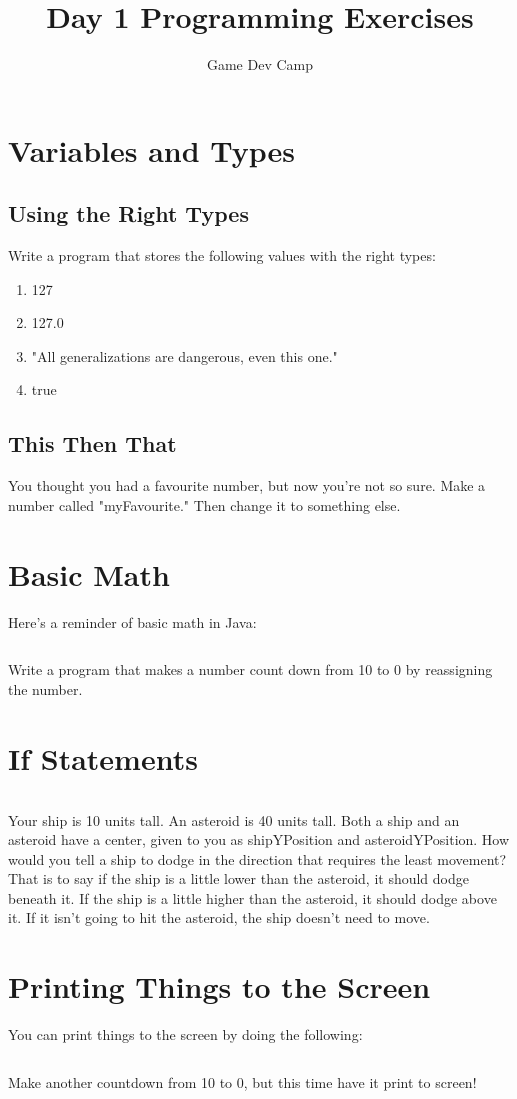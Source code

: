 \documentclass[11pt]{scrartcl}
\title{Day 1 Programming Exercises}
\author{Game Dev Camp}
\begin{document}
	
	\maketitle
	
	\section{Variables and Types}
	
	\subsection{Using the Right Types}
	
		Write a program that stores the following values with the right types:
		
		\begin{enumerate}
			\item 127
			\item 127.0
			\item "All generalizations are dangerous, even this one."
			\item true
		\end{enumerate}
	
	\subsection{This Then That}
	
		You thought you had a favourite number, but now you're not so sure.
		Make a number called "myFavourite."
		Then change it to something else.
		
	\section{Basic Math}
	
		Here's a reminder of basic math in Java:
		
		\inputminted{java}{code-snippets/math.java}
		
		Write a program that makes a number count down from 10 to 0 by reassigning the number.
		
	\section{If Statements}
	
		\inputminted{java}{code-snippets/ifstatements.java}
		
		Your ship is 10 units tall.
		An asteroid is 40 units tall.
		Both a ship and an asteroid have a center, given to you as shipYPosition and asteroidYPosition.
		How would you tell a ship to dodge in the direction that requires the least movement?
		That is to say if the ship is a little lower than the asteroid, it should dodge beneath it.
		If the ship is a little higher than the asteroid, it should dodge above it.
		If it isn't going to hit the asteroid, the ship doesn't need to move.
		
	\section{Printing Things to the Screen}
	
		You can print things to the screen by doing the following:
		
		\inputminted{java}{code-snippets/screenprinting.java}
		
		Make another countdown from 10 to 0, but this time have it print to screen!
	
\end{document}
